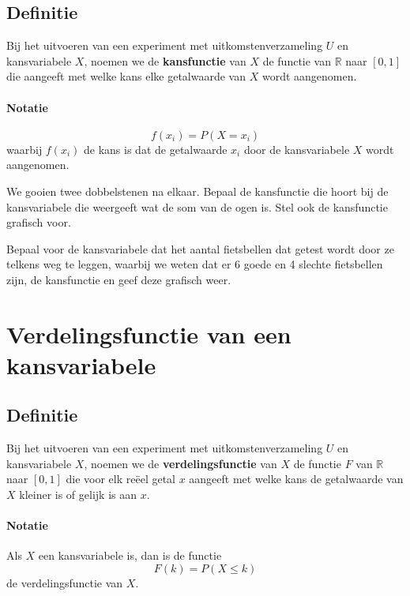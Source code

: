 \documentclass[a4paper,12pt, twoside]{article}
\begin{document}
\subsection{Definitie}

\begin{mdframed}
Bij het uitvoeren van een experiment met uitkomstenverzameling $U$ en kansvariabele $X$, noemen we de {\bf kansfunctie} van $X$ de functie van $\mathbb{R}$ naar $[0,1]$ die aangeeft met welke kans elke getalwaarde van $X$ wordt aangenomen.
\end{mdframed}

\paragraph*{Notatie}
$$f(x_i)=P(X=x_i)$$
waarbij $f(x_i)$ de kans is dat de getalwaarde $x_i$ door de kansvariabele $X$ wordt aangenomen.

\begin{oefening}
We gooien twee dobbelstenen na elkaar. Bepaal de kansfunctie die hoort bij de kansvariabele die weergeeft wat de som van de ogen is. Stel ook de kansfunctie grafisch voor.
\end{oefening}

\begin{oefening}
Bepaal voor de kansvariabele dat het aantal fietsbellen dat getest wordt door ze telkens weg te leggen, waarbij we weten dat er 6 goede en 4 slechte fietsbellen zijn, de kansfunctie en geef deze grafisch weer.
\end{oefening}

\cleardoublepage
\section{Verdelingsfunctie van een kansvariabele}

\subsection{Definitie}

\begin{mdframed}
Bij het uitvoeren van een experiment met uitkomstenverzameling $U$ en kansvariabele $X$, noemen we de {\bf verdelingsfunctie} van $X$ de functie $F$ van $\mathbb{R}$ naar $[0,1]$ die voor elk reëel getal $x$ aangeeft met welke kans de getalwaarde van $X$ kleiner is of gelijk is aan $x$.
\end{mdframed}

\paragraph*{Notatie}
Als $X$ een kansvariabele is, dan is de functie
$$F(k)=P(X\leq k)$$
de verdelingsfunctie van $X$.
\end{document}
